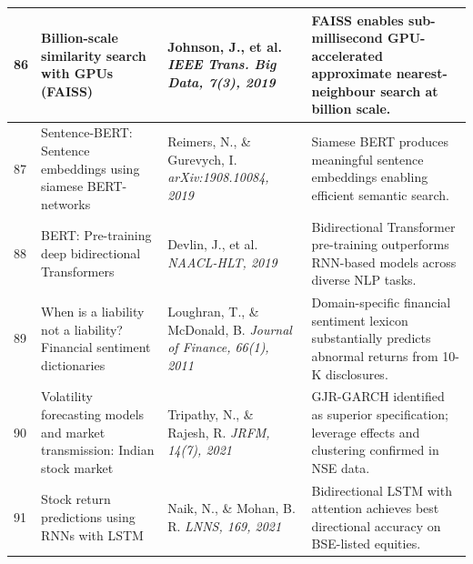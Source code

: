 \documentclass[12pt,a4paper,oneside]{report}
\theoremstyle{definition}
\theoremstyle{remark}
\begin{document}
\begin{center}
\begin{longtable}{|p{0.8cm}|p{4.2cm}|>{\raggedright\arraybackslash}p{4cm}|p{4.5cm}|}
86 & Billion-scale similarity search with GPUs (FAISS) \cite{Johnson2019FAISS} & Johnson, J., et al. \newline\newline \textit{IEEE Trans. Big Data, 7(3), 2019} & FAISS enables sub-millisecond GPU-accelerated approximate nearest-neighbour search at billion scale. \\ \hline

87 & Sentence-BERT: Sentence embeddings using siamese BERT-networks \cite{Reimers2019SBERT} & Reimers, N., \& Gurevych, I. \newline\newline \textit{arXiv:1908.10084, 2019} & Siamese BERT produces meaningful sentence embeddings enabling efficient semantic search. \\ \hline

88 & BERT: Pre-training deep bidirectional Transformers \cite{Devlin2019BERT} & Devlin, J., et al. \newline\newline \textit{NAACL-HLT, 2019} & Bidirectional Transformer pre-training outperforms RNN-based models across diverse NLP tasks. \\ \hline

89 & When is a liability not a liability? Financial sentiment dictionaries \cite{Loughran2011SentimentFinance} & Loughran, T., \& McDonald, B. \newline\newline \textit{Journal of Finance, 66(1), 2011} & Domain-specific financial sentiment lexicon substantially predicts abnormal returns from 10-K disclosures. \\ \hline

90 & Volatility forecasting models and market transmission: Indian stock market \cite{Tripathy2021NiftyVolatility} & Tripathy, N., \& Rajesh, R. \newline\newline \textit{JRFM, 14(7), 2021} & GJR-GARCH identified as superior specification; leverage effects and clustering confirmed in NSE data. \\ \hline

91 & Stock return predictions using RNNs with LSTM \cite{Naik2021LSTM} & Naik, N., \& Mohan, B. R. \newline\newline \textit{LNNS, 169, 2021} & Bidirectional LSTM with attention achieves best directional accuracy on BSE-listed equities. \\ \hline


\end{longtable}
\end{center}
\end{document}
